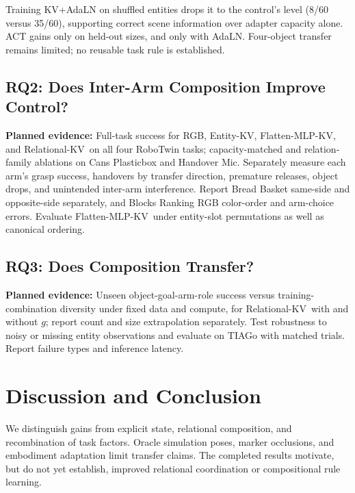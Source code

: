 \documentclass[letterpaper,10pt,conference]{ieeeconf}
\newcommand{\ekv}{Entity-KV}
\newcommand{\fkv}{Flatten-MLP-KV}
\newcommand{\rkv}{Relational-KV}
\begin{document}
Training KV+AdaLN on shuffled entities drops it to the control's level (8/60 versus 35/60), supporting correct scene information over adapter capacity alone. ACT gains only on held-out sizes, and only with AdaLN. Four-object transfer remains limited; no reusable task rule is established.

\subsection{RQ2: Does Inter-Arm Composition Improve Control?}

\textbf{Planned evidence:}
Full-task success for RGB, \ekv, \fkv, and \rkv\ on all four RoboTwin tasks; capacity-matched and relation-family ablations on Cans Plasticbox and Handover Mic. Separately measure each arm's grasp success, handovers by transfer direction, premature releases, object drops, and unintended inter-arm interference. Report Bread Basket same-side and opposite-side separately, and Blocks Ranking RGB color-order and arm-choice errors. Evaluate \fkv\ under entity-slot permutations as well as canonical ordering.

\subsection{RQ3: Does Composition Transfer?}

\textbf{Planned evidence:}
Unseen object-goal-arm-role success versus training-combination diversity under fixed data and compute, for \rkv\ with and without $g$; report count and size extrapolation separately. Test robustness to noisy or missing entity observations and evaluate on TIAGo with matched trials. Report failure types and inference latency.

\section{Discussion and Conclusion}
\label{sec:discussion}

We distinguish gains from explicit state, relational composition, and recombination of task factors. Oracle simulation poses, marker occlusions, and embodiment adaptation limit transfer claims. The completed results motivate, but do not yet establish, improved relational coordination or compositional rule learning.



\end{document}
